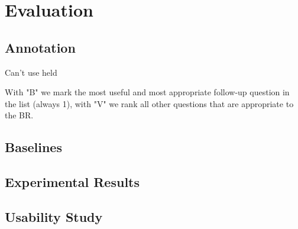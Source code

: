 \section{Evaluation}

\subsection{Annotation}

Can't use held


With "B" we mark the most useful and most appropriate follow-up question in the list (always 1), with "V" we rank all other questions that are appropriate to the BR.

\subsection{Baselines}

\subsection{Experimental Results}

\subsection{Usability Study}
